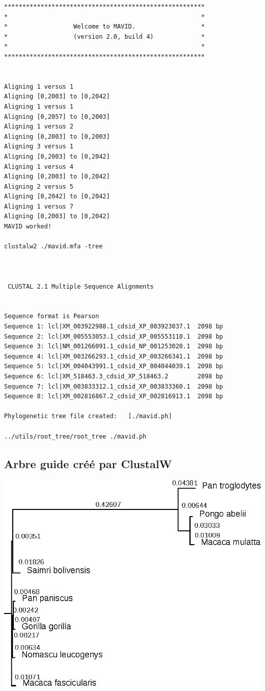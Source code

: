 \documentclass[10.9pt]{article} %
\begin{document}
\begin{verbatim}
*******************************************************
*                                                     *
*                  Welcome to MAVID.                  *
*                  (version 2.0, build 4)             *
*                                                     *
*******************************************************


Aligning 1 versus 1
Aligning [0,2003] to [0,2042]
Aligning 1 versus 1
Aligning [0,2057] to [0,2003]
Aligning 1 versus 2
Aligning [0,2003] to [0,2003]
Aligning 3 versus 1
Aligning [0,2003] to [0,2042]
Aligning 1 versus 4
Aligning [0,2003] to [0,2042]
Aligning 2 versus 5
Aligning [0,2042] to [0,2042]
Aligning 1 versus 7
Aligning [0,2003] to [0,2042]
MAVID worked!

clustalw2 ./mavid.mfa -tree



 CLUSTAL 2.1 Multiple Sequence Alignments


Sequence format is Pearson
Sequence 1: lcl|XM_003922988.1_cdsid_XP_003923037.1  2098 bp
Sequence 2: lcl|XM_005553053.1_cdsid_XP_005553110.1  2098 bp
Sequence 3: lcl|NM_001266091.1_cdsid_NP_001253020.1  2098 bp
Sequence 4: lcl|XM_003266293.1_cdsid_XP_003266341.1  2098 bp
Sequence 5: lcl|XM_004043991.1_cdsid_XP_004044039.1  2098 bp
Sequence 6: lcl|XM_518463.3_cdsid_XP_518463.2        2098 bp
Sequence 7: lcl|XM_003833312.1_cdsid_XP_003833360.1  2098 bp
Sequence 8: lcl|XM_002816867.2_cdsid_XP_002816913.1  2098 bp

Phylogenetic tree file created:   [./mavid.ph]

../utils/root_tree/root_tree ./mavid.ph
\end{verbatim}

\subsection{Arbre guide créé par ClustalW}\label{20}
\includegraphics{annexes/question_4/clustalw/foxp4_ortho.eps}
\end{document}
